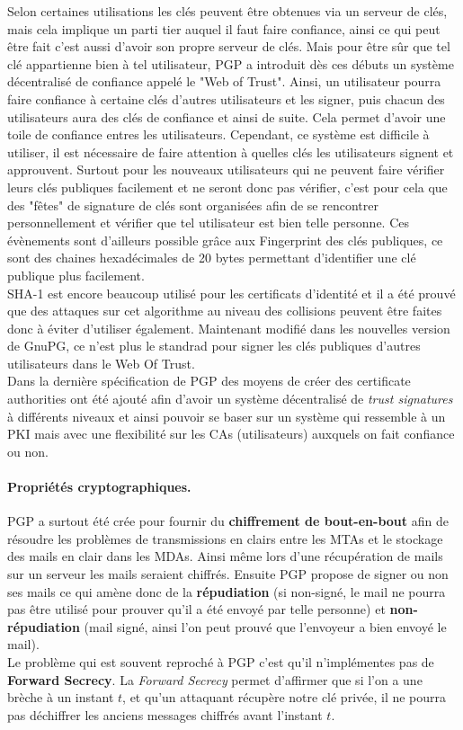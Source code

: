 Selon certaines utilisations les clés peuvent être obtenues via un serveur de clés, mais cela implique un parti tier auquel il faut faire confiance, ainsi ce qui peut être fait c'est aussi d'avoir son propre serveur de clés. Mais pour être sûr que tel clé appartienne bien à tel utilisateur, PGP a introduit dès ces débuts un système décentralisé de confiance appelé le "Web of Trust". Ainsi, un utilisateur pourra faire confiance à certaine clés d'autres utilisateurs et les signer, puis chacun des utilisateurs aura des clés de confiance et ainsi de suite. Cela permet d'avoir une toile de confiance entres les utilisateurs. Cependant, ce système est difficile à utiliser, il est nécessaire de faire attention à quelles clés les utilisateurs signent et approuvent. Surtout pour les nouveaux utilisateurs qui ne peuvent faire vérifier leurs clés publiques facilement et ne seront donc pas vérifier, c'est pour cela que des "fêtes" de signature de clés sont organisées afin de se rencontrer personnellement et vérifier que tel utilisateur est bien telle personne. Ces évènements sont d'ailleurs possible grâce aux Fingerprint des clés publiques, ce sont des chaines hexadécimales de 20 bytes permettant d'identifier une clé publique plus facilement.\\
SHA-1 est encore beaucoup utilisé pour les certificats d'identité et il a été prouvé que des attaques sur cet algorithme au niveau des collisions peuvent être faites~\cite{DBLP:journals/iacr/LeurentP20} donc à éviter d'utiliser également. Maintenant modifié dans les nouvelles version de GnuPG, ce n'est plus le standrad pour signer les clés publiques d'autres utilisateurs dans le Web Of Trust.\\
Dans la dernière spécification de PGP des moyens de créer des certificate authorities ont été ajouté afin d'avoir un système décentralisé de \textit{trust signatures} à différents niveaux et ainsi pouvoir se baser sur un système qui ressemble à un PKI mais avec une flexibilité sur les CAs (utilisateurs) auxquels on fait confiance ou non.
\paragraph*{Propriétés cryptographiques.}
PGP a surtout été crée pour fournir du \textbf{chiffrement de bout-en-bout} afin de résoudre les problèmes de transmissions en clairs entre les MTAs et le stockage des mails en clair dans les MDAs. Ainsi même lors d'une récupération de mails sur un serveur les mails seraient chiffrés. Ensuite PGP propose de signer ou non ses mails ce qui amène donc de la \textbf{répudiation} (si non-signé, le mail ne pourra pas être utilisé pour prouver qu'il a été envoyé par telle personne) et \textbf{non-répudiation} (mail signé, ainsi l'on peut prouvé que l'envoyeur a bien envoyé le mail).\\ 
Le problème qui est souvent reproché à PGP c'est qu'il n'implémentes pas de \textbf{Forward Secrecy}. La \textit{Forward Secrecy} permet d'affirmer que si l'on a une brèche à un instant $t$, et qu'un attaquant récupère notre clé privée, il ne pourra pas déchiffrer les anciens messages chiffrés avant l'instant $t$.
